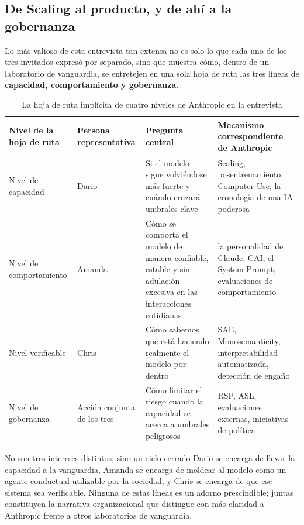 \documentclass[a4paper]{article}
\begin{document}
\subsection{De Scaling al producto, y de ahí a la gobernanza}

Lo más valioso de esta entrevista tan extensa no es solo lo que cada uno de los tres invitados expresó por separado, sino que muestra cómo, dentro de un laboratorio de vanguardia, se entretejen en una sola hoja de ruta las tres líneas de \textbf{capacidad, comportamiento y gobernanza}.

\begin{table}[H]
\centering
\begin{tabular}{p{} p{} p{} p{}}
\toprule
Nivel de la hoja de ruta & Persona representativa & Pregunta central & Mecanismo correspondiente de Anthropic \\
\midrule
Nivel de capacidad & Dario & Si el modelo sigue volviéndose más fuerte y cuándo cruzará umbrales clave & Scaling, posentrenamiento, Computer Use, la cronología de una IA poderosa \\
Nivel de comportamiento & Amanda & Cómo se comporta el modelo de manera confiable, estable y sin adulación excesiva en las interacciones cotidianas & la personalidad de Claude, CAI, el System Prompt, evaluaciones de comportamiento \\
Nivel verificable & Chris & Cómo sabemos qué está haciendo realmente el modelo por dentro & SAE, Monosemanticity, interpretabilidad automatizada, detección de engaño \\
Nivel de gobernanza & Acción conjunta de los tres & Cómo limitar el riesgo cuando la capacidad se acerca a umbrales peligrosos & RSP, ASL, evaluaciones externas, iniciativas de política \\
\bottomrule
\end{tabular}
\caption{La hoja de ruta implícita de cuatro niveles de Anthropic en la entrevista}
\end{table}

\begin{importantbox}{No son tres intereses distintos, sino un ciclo cerrado}
Dario se encarga de llevar la capacidad a la vanguardia, Amanda se encarga de moldear al modelo como un agente conductual utilizable por la sociedad, y Chris se encarga de que ese sistema sea verificable. Ninguna de estas líneas es un adorno prescindible; juntas constituyen la narrativa organizacional que distingue con más claridad a Anthropic frente a otros laboratorios de vanguardia.
\end{importantbox}
\end{document}
